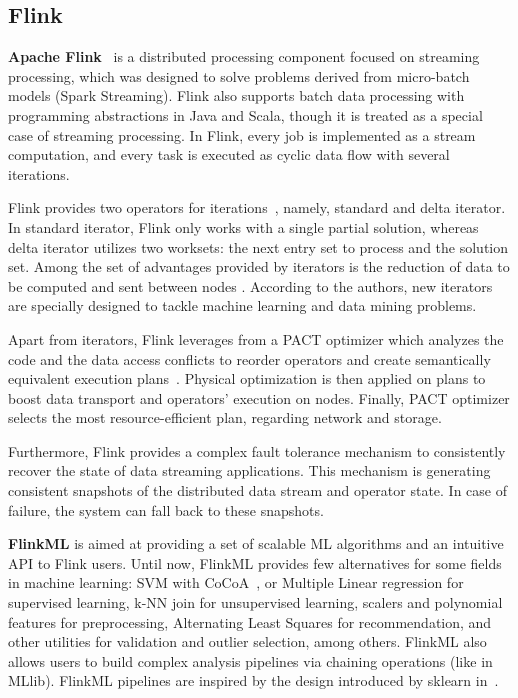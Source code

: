 \documentclass[3p,review]{elsarticle}
\begin{document}
\subsection{Flink}\label{subsec:flink}

\textbf{Apache Flink}~\cite{flink} is a distributed processing component focused on streaming processing, which was designed to solve problems derived from micro-batch models (Spark Streaming). Flink also supports batch data processing with programming abstractions in Java and Scala, though it is treated as a special case of streaming processing. In Flink, every job is implemented as a stream computation, and every task is executed as cyclic data flow with several iterations. 

Flink provides two operators for iterations~\cite{flinkengine}, namely, standard and delta iterator. In standard iterator, Flink only works with a single partial solution, whereas delta iterator utilizes two worksets: the next entry set to process and the solution set.
Among the set of advantages provided by iterators is the reduction of data to be computed and sent between nodes \cite{EwenTKM12}. According to the authors, new iterators are specially designed to tackle machine learning and data mining problems.

Apart from iterators, Flink leverages from a PACT optimizer which analyzes the code and the data access conflicts to reorder operators and create semantically equivalent execution plans~\cite{Alexandrov14,Hues12}. Physical optimization is then applied on plans to boost data transport and operators' execution on nodes. Finally, PACT optimizer selects the most resource-efficient plan, regarding network and storage.

Furthermore, Flink provides a complex fault tolerance mechanism to consistently recover the state of data streaming applications. This mechanism is generating consistent snapshots of the distributed data stream and operator state. In case of failure, the system can fall back to these snapshots.

\textbf{FlinkML} is aimed at providing a set of scalable ML algorithms and an intuitive API to Flink users. Until now, FlinkML provides few alternatives for some fields in machine learning: SVM with CoCoA~\cite{jaggi14}, or Multiple Linear regression for supervised learning, k-NN join for unsupervised learning, scalers and polynomial features for preprocessing, Alternating Least Squares for recommendation, and other utilities for validation and outlier selection, among others. FlinkML also allows users to build complex analysis pipelines via chaining operations (like in MLlib). FlinkML pipelines are inspired by the design introduced by sklearn in~\cite{buitin13}.
\end{document}

